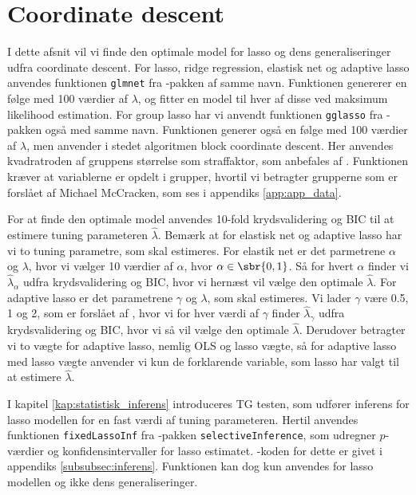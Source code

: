\section{Coordinate descent}
I dette afsnit vil vi finde den optimale model for lasso og dens generaliseringer udfra coordinate descent.
For lasso, ridge regression, elastisk net og adaptive lasso anvendes funktionen \texttt{glmnet} fra \Rlang-pakken af samme navn.
Funktionen genererer en følge med 100 værdier af $\lambda$, og fitter en model til hver af disse ved maksimum likelihood estimation.
For group lasso har vi anvendt funktionen \texttt{gglasso} fra \Rlang-pakken også med samme navn. 
Funktionen generer også en følge med 100 værdier af $\lambda$, men anvender i stedet algoritmen block coordinate descent. Her anvendes kvadratroden af gruppens størrelse som straffaktor, som anbefales af \citep{group_lasso}.
Funktionen kræver at variablerne er opdelt i grupper, hvortil vi betragter grupperne som er forslået af Michael McCracken, som ses i appendiks \ref{app:app_data}. 

For at finde den optimale model anvendes 10-fold krydsvalidering og BIC til at estimere tuning parameteren $\widehat\lambda$.
Bemærk at for elastisk net og adaptive lasso har vi to tuning parametre, som skal estimeres. 
For elastik net er det parmetrene $\alpha$ og $\lambda$, hvor vi vælger 10 værdier af \(\alpha\), hvor $\alpha \in \sbr{0,1}$.  Så for hvert  \(\alpha\) finder vi \(\widehat{\lambda}_\alpha\) udfra krydsvalidering og BIC, hvor vi hernæst vil vælge den optimale $\widehat\lambda$.  
For adaptive lasso er det parametrene $\gamma$ og $\lambda$, som skal estimeres.
Vi lader $\gamma$ være 0.5, 1 og 2, som er forslået af \citep{adaptive_lasso}, hvor vi for hver værdi af $\gamma$ finder \(\widehat{\lambda}_\gamma\) udfra krydsvalidering og BIC, hvor vi så vil vælge den optimale $\widehat\lambda$.
Derudover betragter vi to vægte for adaptive lasso, nemlig OLS og lasso vægte, så for adaptive lasso med lasso vægte anvender vi kun de forklarende variable, som lasso har valgt til at estimere $\widehat{\lambda}$. 

I kapitel \ref{kap:statistisk_inferens} introduceres TG testen, som udfører inferens for lasso modellen for en fast værdi af tuning parameteren.
Hertil anvendes funktionen \texttt{fixedLassoInf} fra \Rlang-pakken \texttt{selectiveInference}, som udregner \(p\)-værdier og konfidensintervaller for lasso estimatet.
\Rlang-koden for dette er givet i appendiks \ref{subsubsec:inferens}.
Funktionen kan dog kun anvendes for lasso modellen og ikke dens generaliseringer. 






